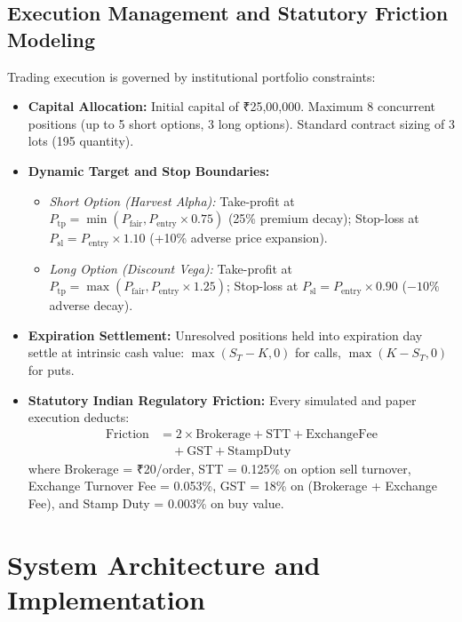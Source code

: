 \documentclass[journal]{IEEEtran}
\begin{document}
\subsection{Execution Management and Statutory Friction Modeling}
Trading execution is governed by institutional portfolio constraints:
\begin{itemize}
    \item \textbf{Capital Allocation:} Initial capital of ₹25,00,000. Maximum 8 concurrent positions (up to 5 short options, 3 long options). Standard contract sizing of 3 lots (195 quantity).
    \item \textbf{Dynamic Target and Stop Boundaries:}
    \begin{itemize}
        \item \emph{Short Option (Harvest Alpha):} Take-profit at $P_{\mathrm{tp}} = \min(P_{\mathrm{fair}}, P_{\mathrm{entry}} \times 0.75)$ (25\% premium decay); Stop-loss at $P_{\mathrm{sl}} = P_{\mathrm{entry}} \times 1.10$ (+10\% adverse price expansion).
        \item \emph{Long Option (Discount Vega):} Take-profit at $P_{\mathrm{tp}} = \max(P_{\mathrm{fair}}, P_{\mathrm{entry}} \times 1.25)$; Stop-loss at $P_{\mathrm{sl}} = P_{\mathrm{entry}} \times 0.90$ ($-10\%$ adverse decay).
    \end{itemize}
    \item \textbf{Expiration Settlement:} Unresolved positions held into expiration day settle at intrinsic cash value: $\max(S_T - K, 0)$ for calls, $\max(K - S_T, 0)$ for puts.
    \item \textbf{Statutory Indian Regulatory Friction:} Every simulated and paper execution deducts:
    \begin{equation}
    \begin{aligned}
    \mathrm{Friction} &= 2 \times \mathrm{Brokerage} + \mathrm{STT} + \mathrm{ExchangeFee} \\
    &\quad + \mathrm{GST} + \mathrm{StampDuty}
    \end{aligned}
    \end{equation}
    where Brokerage = ₹20/order, STT = 0.125\% on option sell turnover, Exchange Turnover Fee = 0.053\%, GST = 18\% on (Brokerage + Exchange Fee), and Stamp Duty = 0.003\% on buy value.
\end{itemize}

\section{System Architecture and Implementation}
\end{document}
